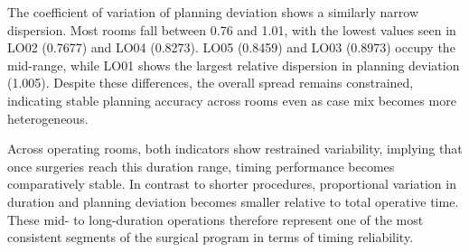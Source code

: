 \documentclass[
]{article}
\begin{document}
The coefficient of variation of planning deviation shows a similarly
narrow dispersion. Most rooms fall between 0.76 and 1.01, with the
lowest values seen in LO02 (0.7677) and LO04 (0.8273). LO05 (0.8459) and
LO03 (0.8973) occupy the mid-range, while LO01 shows the largest
relative dispersion in planning deviation (1.005). Despite these
differences, the overall spread remains constrained, indicating stable
planning accuracy across rooms even as case mix becomes more
heterogeneous.

Across operating rooms, both indicators show restrained variability,
implying that once surgeries reach this duration range, timing
performance becomes comparatively stable. In contrast to shorter
procedures, proportional variation in duration and planning deviation
becomes smaller relative to total operative time. These mid- to
long-duration operations therefore represent one of the most consistent
segments of the surgical program in terms of timing reliability.
\end{document}
